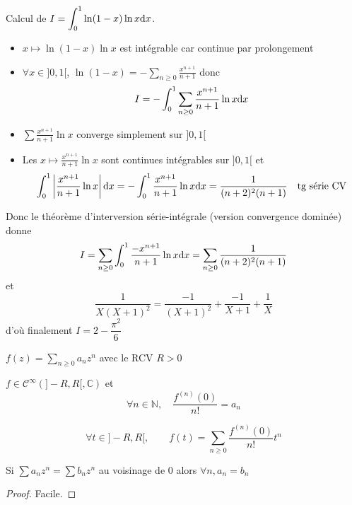 \begin{ex}
    Calcul de $I=\displaystyle\int_0^1\ln(1-x)\ln x\mathrm{d} x$. \begin{itemize}
        \item $x\longmapsto \ln(1-x)\ln x$ est intégrable car continue par prolongement
        \item $\forall x\in ]0,1[$, $\ln(1-x)=-\sum_{n\geq 0}\frac{x^{n+1}}{n+1}$ donc \[
                I=-\int_0^1\sum_{n\geq 0}\frac{x^{n+1}}{n+1}\ln x\mathrm{d} x
            \]
        \item $\sum \frac{x^{n+1}}{n+1}\ln x$ converge simplement sur $]0,1[$
        \item Les $x\longmapsto \frac{x^{n+1}}{n+1}\ln x$ sont continues intégrables sur $]0, 1[$ et \[
                \int_0^1 \left| \frac{x^{n+1}}{n+1}\ln x \right|\mathrm{d} x=-\int_0^1\frac{x^{n+1}}{n+1}\ln x\mathrm{d} x=\frac1{(n+2)^2(n+1)}\quad \text{tg série CV}
            \]
    \end{itemize}
    Donc le théorème d'interversion série-intégrale (version convergence dominée) donne \[
        I=\sum_{n\geq 0}\int_0^1\frac{-x^{n+1}}{n+1}\ln x\mathrm{d} x=\sum_{n\geq 0}\frac{1}{(n+2)^2(n+1)}
    \]
    et \[
        \frac1{X(X+1)^2}=\frac{-1}{(X+1)^2}+\frac{-1}{X+1}+\frac1X
    \]
    d'où finalement $I=2-\dfrac{\pi^2}6$
\end{ex}

\begin{thm}
    \Hyp $f(z)=\sum_{n\geq 0}a_nz^n$ avec le RCV $R>0$
    \begin{concenum}
    \item $f\in\mathcal C^\infty(]-R, R[, \mathbb C)$ et \[\forall n\in\mathbb N, \quad \frac{f^{(n)}(0)}{n!}=a_n\]
    \item \[
            \forall t\in ]-R, R[, \qquad f(t)=\sum_{n\geq 0}\frac{f^{(n)}(0)}{n!}t^n
        \]
    \item Si $\sum a_nz^n=\sum b_nz^n$ au voisinage de $0$ alors $\forall n, a_n=b_n$
    \end{concenum}
\end{thm}

\begin{proof}
    Facile.
\end{proof}

